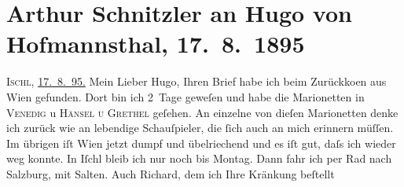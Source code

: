 

         
         \renewcommand{\erwaehntePersonen}{Personen: Lou Andreas-Salomé, Richard Beer-Hofmann, Paul Goldmann, Hugo von Hofmannsthal, Fedor Mamroth, Felix Salten}
         \renewcommand{\erwaehnteOrte}{Orte: Bad Ischl, Hodonín, München, Salzburg, Venedig in Wien, Wien}
         \renewcommand{\erwaehnteWerke}{Werke: Die Frau des Weisen. Erzählung, Ein Abschied, Freiwild. Schauspiel in 3 Akten, Hänsel und Grethel}
               \section[Arthur Schnitzler an Hugo von Hofmannsthal, 17. 8. 1895]{ Arthur Schnitzler an Hugo von Hofmannsthal, 17. 8. 1895}\nopagebreak{}\rehead{ }\begin{ledgroupsized}[t]{13cm}\normalsize\beginnumbering \toendnotes[C]{\smallbreak\pagebreak[2]} 
\toendnotes[C]{\smallbreak}\pstart
           \raggedleft{}{\pb}\textsc{Ischl}, \uline{17. 8. 95.}\pend
           \pstart
           Mein Lieber Hugo, Ihren Brief habe ich beim Zurückko{\geminationm}en aus Wien
               gefunden. Dort bin ich 2 Tage geweſen und habe die Marionetten in \textsc{Venedig} u \textsc{Hänsel u Grethel} geſehen. An einzelne von dieſen Marionetten denke ich zurück wie an lebendige
               Schauſpieler, die ſich auch an mich erinnern müſſen. Im übrigen iſt Wien jetzt dumpf und übelriechend und es iſt gut, daſs ich
               wieder weg konnte. In Iſchl bleib ich nur noch
               bis Montag. Dann fahr ich per Rad nach Salzburg,
               mit Salten. {\pb}Auch
                  Richard, dem ich Ihre Kränkung beſtellt

\end{ledgroupsized}
